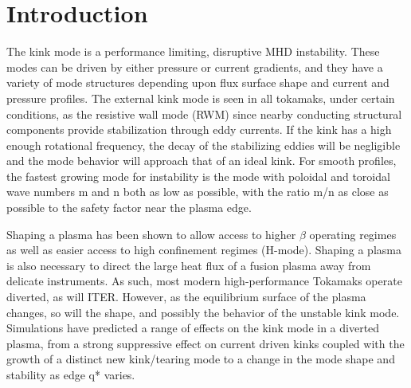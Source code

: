 \documentclass[aps,prl,twocolumn,superscriptaddress,groupedaddress]{revtex4}  %
\begin{document}
\section{Introduction}
The kink mode is a performance limiting, disruptive MHD instability\cite{Strait}.  These modes can be driven by either pressure or current gradients, and they have a variety of mode structures depending upon flux surface shape and current and pressure profiles.  The external kink mode is seen in all tokamaks, under certain conditions, as the resistive wall mode (RWM) since nearby conducting structural components provide stabilization through eddy currents.  If the kink has a high enough rotational frequency, the decay of the stabilizing eddies will be negligible and the mode behavior will approach that of an ideal kink.  For smooth profiles, the fastest growing mode for instability is the mode with poloidal and toroidal wave numbers m and n both as low as possible, with the ratio m/n as close as possible to the safety factor near the plasma edge.\par
	Shaping a plasma has been shown to allow access to higher $\beta$ operating regimes as well as easier access to high confinement regimes (H-mode)\citep{Lazarus, Keilhacker_HMode}. Shaping a plasma is also necessary to direct the large heat flux of a fusion plasma away from delicate instruments.  As such, most modern high-performance Tokamaks operate diverted, as will ITER.  However, as the equilibrium surface of the plasma changes, so will the shape, and possibly the behavior of the unstable kink mode.  Simulations have predicted a range of effects on the kink mode in a diverted plasma, from a strong suppressive effect on current driven kinks coupled with the growth of a distinct new kink/tearing mode\cite{Huysmans} to a change in the mode shape and stability as edge q* varies\cite{Maurer}.\par
\end{document}
